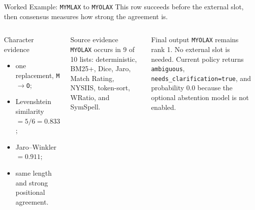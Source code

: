 \documentclass[aspectratio=169,10pt]{beamer}
\newcommand{\code}[1]{\texttt{#1}}
\begin{document}
\begin{frame}{Worked Example: \code{MYMLAX} to \code{MYOLAX}}
\small
This row succeeds before the external slot, then consensus measures how strong
the agreement is.

\begin{columns}[T,onlytextwidth]
\begin{block}{Character evidence}
\begin{itemize}
  \item one replacement, \code{M}$\rightarrow$\code{O};
  \item Levenshtein similarity $=5/6=0.833$;
  \item Jaro--Winkler $=0.911$;
  \item same length and strong positional agreement.
\end{itemize}
\end{block}

\begin{block}{Source evidence}
\code{MYOLAX} occurs in 9 of 10 lists: deterministic, BM25+, Dice, Jaro,
Match Rating, NYSIIS, token-sort, WRatio, and SymSpell.
\end{block}

\begin{exampleblock}{Final output}
\code{MYOLAX} remains rank 1. No external slot is needed. Current policy returns
\code{ambiguous}, \code{needs\_clarification=true}, and probability $0.0$
because the optional abstention model is not enabled.
\end{exampleblock}
\end{columns}
\end{frame}
\end{document}
